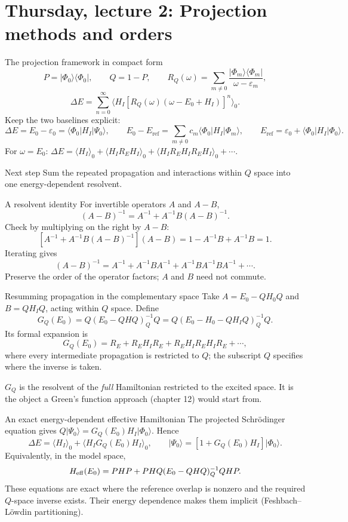 \documentclass[aspectratio=169,10pt]{beamer}
\newcommand{\mbbox}[1]{%
  \begin{tcolorbox}[colback=paleblue,colframe=uioblue,title={\bfseries Many-body connection}]
  #1
  \end{tcolorbox}}
\newcommand{\ket}[1]{\vert #1\rangle}
\newcommand{\bra}[1]{\langle #1\vert}
\newcommand{\mel}[3]{\langle #1\lvert #2\rvert #3\rangle}
\newcommand{\av}[1]{\langle #1\rangle_0}
\newcommand{\Eref}{E_{\mathrm{ref}}}
\newcommand{\ph}{\Phi_0}
\newcommand{\Psizero}{\Psi_0}
\begin{document}
\section{Thursday, lecture 2: Projection methods and orders}

\begin{frame}{The projection framework in compact form}
\[
P=\ket{\ph}\bra{\ph},\qquad Q=1-P,\qquad
R_Q(\omega)=\sum_{m\ne0}\frac{\ket{\Phi_m}\bra{\Phi_m}}{\omega-\varepsilon_m},
\]
\[
\Delta E=\sum_{n=0}^{\infty}
\av{H_I\left[R_Q(\omega)(\omega-E_0+H_I)\right]^n}.
\]
Keep the two baselines explicit:
\[
\Delta E=E_0-\varepsilon_0=\mel{\ph}{H_I}{\Psizero},\qquad
E_0-\Eref=\sum_{m\ne0}c_m\mel{\ph}{H_I}{\Phi_m},\qquad
\Eref=\varepsilon_0+\mel{\ph}{H_I}{\ph}.
\]
For \(\omega=E_0\): \(\Delta E=\av{H_I}+\av{H_I R_E H_I}+\av{H_I R_E H_I R_E H_I}+\cdots\).
\begin{block}{Next step}
Sum the repeated propagation and interactions within \(Q\) space into one energy-dependent resolvent.
\end{block}
\end{frame}

\begin{frame}{A resolvent identity}
For invertible operators \(A\) and \(A-B\),
\[
\boxed{(A-B)^{-1}=A^{-1}+A^{-1}B(A-B)^{-1}.}
\]
Check by multiplying on the right by \(A-B\):
\[
\left[A^{-1}+A^{-1}B(A-B)^{-1}\right](A-B)
=1-A^{-1}B+A^{-1}B=1.
\]
Iterating gives
\[
(A-B)^{-1}=A^{-1}+A^{-1}BA^{-1}
+A^{-1}BA^{-1}BA^{-1}+\cdots .
\]
\small Preserve the order of the operator factors; \(A\) and \(B\) need not commute.
\end{frame}

\begin{frame}{Resumming propagation in the complementary space}
Take \(A=E_0-QH_0Q\) and \(B=QH_IQ\), acting within \(Q\) space. Define
\[
G_Q(E_0)=Q\left(E_0-QHQ\right)^{-1}_{Q}Q
=Q\left(E_0-H_0-QH_IQ\right)^{-1}_{Q}Q .
\]
Its formal expansion is
\[
G_Q(E_0)=R_E+R_E H_I R_E
+R_E H_I R_E H_I R_E+\cdots,
\]
where every intermediate propagation is restricted to \(Q\); the subscript \(Q\) specifies where the inverse is taken.
\mbbox{\(G_Q\) is the resolvent of the \emph{full} Hamiltonian restricted to the excited space. It is the object a Green's function approach (chapter 12) would start from.}
\end{frame}

\begin{frame}{An exact energy-dependent effective Hamiltonian}
The projected Schr\"odinger equation gives \(Q\ket{\Psizero}=G_Q(E_0)H_I\ket{\ph}\). Hence
\[
\boxed{\Delta E=\av{H_I}+\av{H_I G_Q(E_0)H_I},}
\qquad
\boxed{\ket{\Psizero}=\left[1+G_Q(E_0)H_I\right]\ket{\ph}.}
\]
Equivalently, in the model space,
\[
H_{\rm eff}(E_0)=PHP+PHQ(E_0-QHQ)^{-1}_{Q}QHP .
\]
\small These equations are exact where the reference overlap is nonzero and the required \(Q\)-space inverse exists. Their energy dependence makes them implicit (Feshbach--L\"owdin partitioning).
\end{frame}
\end{document}
